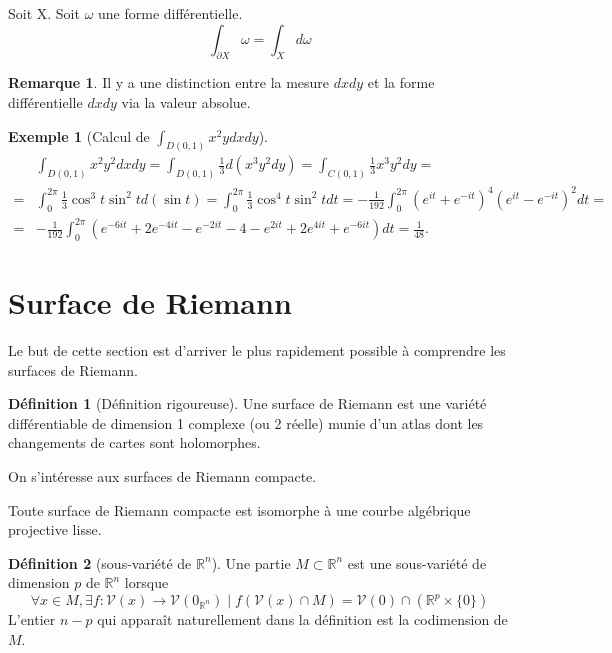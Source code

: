 \documentclass{article}
\newcommand{\R}{\mathbb{R}} %
\newcommand{\V}{\mathscr{V}} %
\theoremstyle{definition} %
\newtheorem{defi}{Définition}
\newtheorem{rmq}{Remarque}
\newtheorem{ex}{Exemple}
\newcommand{\1}{\mathbb{1}} %
\begin{document}
\begin{tcolorbox}[colback=blue!5!white,colframe=blue!75!black,title=Théorème de Stokes]
    Soit X. Soit $\omega$ une forme différentielle.
    $$\int_{\partial X} \omega = \int_X d \omega$$
    
\end{tcolorbox}

\begin{rmq}
Il y a une distinction entre la mesure $dxdy$ et la forme différentielle $dxdy$ via la valeur absolue.
\end{rmq}

\begin{ex}[Calcul de $\int_{D(0,1)} x^2 y dx dy$]

    \begin{align*}&\int_{D(0,1)} x^2 y^2 dx dy=\int_{D(0,1)}\frac{1}{3}d(x^3y^2dy)=\int_{C(0,1)}\frac{1}{3}x^3y^2dy=\\=&\int_0^{2\pi}\frac{1}{3}\cos^3t\sin^2td(\sin t)=\int_0^{2\pi}\frac{1}{3}\cos^4t\sin^2tdt=-\frac{1}{192}\int_0^{2\pi}(e^{it}+e^{-it})^4(e^{it}-e^{-it})^2dt=\\=&-\frac{1}{192}\int_0^{2\pi}(e^{-6it}+2e^{-4it}-e^{-2it}-4-e^{2it}+2e^{4it}+e^{-6it})dt=\frac{1}{48}.
    \end{align*}

\end{ex}


\section{Surface de Riemann}
Le but de cette section est d'arriver le plus rapidement possible à comprendre les surfaces de Riemann.

\begin{defi}[Définition rigoureuse]
Une surface de Riemann est une variété différentiable de dimension 1 complexe (ou 2 réelle) munie d'un atlas dont les changements de cartes sont holomorphes.
\end{defi}

On s'intéresse aux surfaces de Riemann compacte.

\begin{tcolorbox}[colback=blue!5!white,colframe=blue!75!black,title=Théorème]
    Toute surface de Riemann compacte est isomorphe à une courbe algébrique projective lisse.
\end{tcolorbox}

\begin{defi}[sous-variété de $\R^n$]
Une partie $M \subset \R^n$ est une sous-variété de dimension $p$ de $\R^n$ lorsque
$$\forall x \in M, \exists f : \V(x) \to \V(0_{\R^n}) \mid f(\V(x) \cap M) = \V(0) \cap (\R^p \times \{0\})$$
L'entier $n-p$ qui apparaît naturellement dans la définition est la codimension de $M$.
\end{defi}
\end{document}
